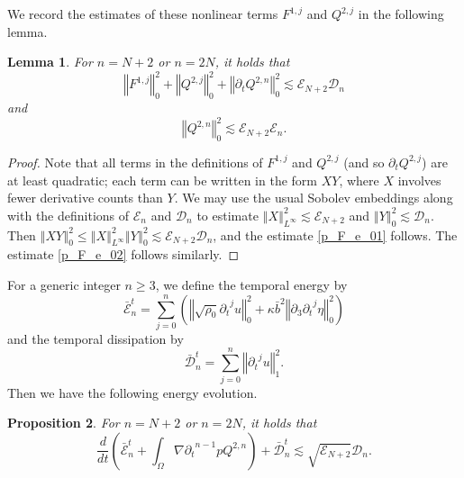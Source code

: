 \documentclass[a4paper,reqno,11pt]{amsart}
\numberwithin{equation}{section}
\providecommand{\norm}[1]{\left\Vert#1\right\Vert}
\providecommand{\sd}[1]{\mathcal{D}_{#1}}
\providecommand{\se}[1]{\mathcal{E}_{#1}}
\providecommand{\ns}[1]{\norm{#1}^2}
\providecommand{\norm}[1]{\left\Vert#1\right\Vert}
\newtheorem{lem}{Lemma}[section]
\newtheorem{prop}[lem]{Proposition}
\begin{document}
We record the estimates of these nonlinear terms $F^{1,j}$ and $Q^{2,j}$ in the following lemma.
\begin{lem}\label{p_F_estimates}
For $n=N+2$ or $n=2N$, it holds that
\begin{equation}\label{p_F_e_01}
 \ns{F^{1,j} }_{0}+\ns{   Q^{2,j} }_{0}  + \ns{ {\partial_t} Q^{2,n} }_{0}{\lesssim} \se{N+2} \sd{n}
\end{equation}
and
\begin{equation}\label{p_F_e_02}
\norm{Q^{2,n} }_0^2   {\lesssim} \se{N+2}\se{n} .
\end{equation}
\end{lem}
\begin{proof}
Note that all terms in the definitions of $F^{1,j}$ and $Q^{2,j}$ (and so ${\partial_t} Q^{2,j}$) are at least quadratic; each term can be written in the form $X Y$, where $X$ involves fewer derivative counts than $Y$. We may use the usual Sobolev embeddings along with the definitions of $\se{n}$ and $\sd{n} $ to estimate $\norm{X}_{L^\infty}^2{\lesssim}  \se{N+2} $ and $\norm{Y}_{0}^2{\lesssim}   \sd{n} $.
Then $\norm{XY}_0^2\le \norm{X}_{L^\infty}^2\norm{Y}_{0}^2{\lesssim}   \se{N+2} \sd{n} $, and the estimate \eqref{p_F_e_01} follows. The estimate \eqref{p_F_e_02} follows similarly.
\end{proof}

For a generic integer $n\ge 3$, we define the temporal energy by
\begin{equation}
 \bar{\mathcal{E}}^{t}_{n} =
 \sum_{j=0}^{n} \left( \norm{\sqrt{\rho_0}{\partial_t}^j u}_0^2+\kappa\bar b^2 \norm{{\partial}_3{\partial_t}^j\eta}_0^2
 \right)
\end{equation}
and the temporal dissipation by
\begin{equation}
 \bar{\mathcal{D}}_n^{t} = \sum_{j=0}^{ n}  \norm{{\partial_t}^j u}_1^2.
\end{equation}
Then we have the following energy evolution.
\begin{prop}\label{i_temporal_evolution  N}
For $n=N+2$ or $n=2N$, it holds that
\begin{equation} \label{i_te_0}
  \frac{d}{dt}\left(\bar{\mathcal{E}}_{n}^{t}+\int_\Omega  \nabla {\partial_t}^{n-1} p  Q^{2,n}\right)
+ \bar{\mathcal{D}}_{n}^{t}
  {\lesssim}   \sqrt{\se{N+2} } \sd{ n}.
\end{equation}
\end{prop}
\end{document}
